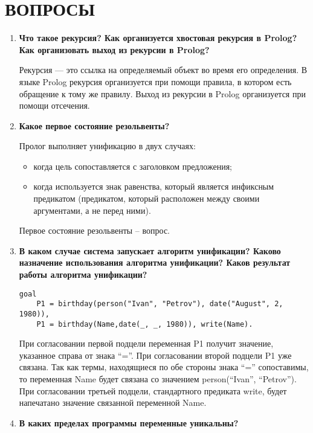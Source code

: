 \section{ВОПРОСЫ}

\begin{enumerate}
    \item \textbf{Что такое рекурсия? Как организуется хвостовая рекурсия в Prolog? Как организовать выход из рекурсии в Prolog?}

        Рекурсия — это ссылка на определяемый объект во время его определения. В языке Prolog рекурсия организуется при помощи правила, в котором есть обращение к тому же правилу. Выход из рекурсии в Prolog организуется при помощи отсечения.

    \item \textbf{Какое первое состояние резольвенты?}

        Пролог выполняет унификацию в двух случаях:

        \begin{itemize}
            \item когда цель сопоставляется с заголовком предложения;
            \item когда используется знак равенства, который является инфиксным предикатом (предикатом, который расположен между своими аргументами, а не перед ними).
        \end{itemize}

        Первое состояние резольвенты -- вопрос.

    \item \textbf{В каком случае система запускает алгоритм унификации? Каково назначение использования алгоритма унификации?  Каков  результат работы алгоритма унификации? }

\begin{lstlisting}
goal
    P1 = birthday(person("Ivan", "Petrov"), date("August", 2, 1980)),
    P1 = birthday(Name,date(_, _, 1980)), write(Name).
\end{lstlisting}

        При согласовании первой подцели переменная P1 получит значение, указанное справа от знака ``=''. При согласовании второй подцели P1 уже связана. Так как термы, находящиеся по обе стороны знака ``='' сопоставимы, то переменная Name будет связана со значением person(``Ivan'', ``Petrov''). При согласовании третьей подцели, стандартного предиката write, будет напечатано значение связанной переменной Name.

    \item \textbf{В каких пределах программы переменные уникальны? }


\end{enumerate}
